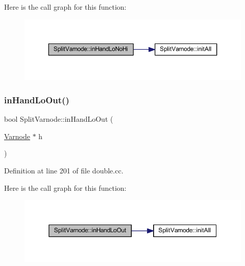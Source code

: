 Here is the call graph for this function\+:
\nopagebreak
\begin{figure}[H]
\begin{center}
\leavevmode
\includegraphics[width=350pt]{class_split_varnode_a45771bce187576ac97d128c80c364f39_cgraph}
\end{center}
\end{figure}
\mbox{\label{class_split_varnode_a5c34881b35017222348dd0ba967e7019}} 
\subsubsection{\texorpdfstring{inHandLoOut()}{inHandLoOut()}}
{\footnotesize\ttfamily bool Split\+Varnode\+::in\+Hand\+Lo\+Out (\begin{DoxyParamCaption}\item[{\mbox{\hyperlink{class_varnode}{Varnode}} $\ast$}]{h }\end{DoxyParamCaption})}



Definition at line 201 of file double.\+cc.

Here is the call graph for this function\+:
\nopagebreak
\begin{figure}[H]
\begin{center}
\leavevmode
\includegraphics[width=350pt]{class_split_varnode_a5c34881b35017222348dd0ba967e7019_cgraph}
\end{center}
\end{figure}
\mbox{\label{class_split_varnode_a9acc5b01b242ad7d852ec86a1af62b51}} 
